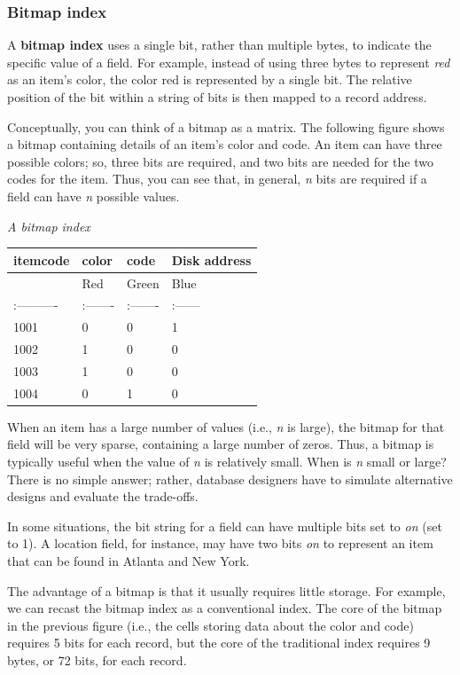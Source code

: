 \documentclass[
]{article}
\begin{document}
\hypertarget{bitmap-index}{%
\subsubsection*{Bitmap index}\label{bitmap-index}}

A \textbf{bitmap index} uses a single bit, rather than multiple bytes, to
indicate the specific value of a field. For example, instead of using
three bytes to represent \emph{red} as an item's color, the color red is
represented by a single bit. The relative position of the bit within a
string of bits is then mapped to a record address.

Conceptually, you can think of a bitmap as a matrix. The following
figure shows a bitmap containing details of an item's color and code. An
item can have three possible colors; so, three bits are required, and
two bits are needed for the two codes for the item. Thus, you can see
that, in general, \emph{n} bits are required if a field can have \emph{n} possible
values.

\emph{A bitmap index}

\begin{longtable}[]{@{}llll@{}}
\toprule
itemcode & color & code & Disk address \\
\midrule
\endhead
& Red & Green & Blue \\
:---------- & :------- & :------- & :------ \\
1001 & 0 & 0 & 1 \\
1002 & 1 & 0 & 0 \\
1003 & 1 & 0 & 0 \\
1004 & 0 & 1 & 0 \\
\bottomrule
\end{longtable}

When an item has a large number of values (i.e., \emph{n} is large), the
bitmap for that field will be very sparse, containing a large number of
zeros. Thus, a bitmap is typically useful when the value of \emph{n} is
relatively small. When is \emph{n} small or large? There is no simple answer;
rather, database designers have to simulate alternative designs and
evaluate the trade-offs.

In some situations, the bit string for a field can have multiple bits
set to \emph{on} (set to 1). A location field, for instance, may have two
bits \emph{on} to represent an item that can be found in Atlanta and New
York.

The advantage of a bitmap is that it usually requires little storage.
For example, we can recast the bitmap index as a conventional index. The
core of the bitmap in the previous figure (i.e., the cells storing data
about the color and code) requires 5 bits for each record, but the core
of the traditional index requires 9 bytes, or 72 bits, for each record.
\end{document}
